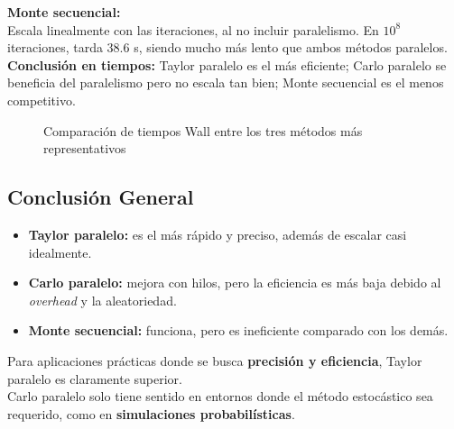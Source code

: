 \documentclass[a4paper,12pt]{article}
\begin{document}
\textbf{Monte secuencial:} \\
Escala linealmente con las iteraciones, al no incluir paralelismo. 
En $10^{8}$ iteraciones, tarda 38.6 s, siendo mucho más lento que ambos métodos paralelos. \\

\textbf{Conclusión en tiempos:} Taylor paralelo es el más eficiente; 
Carlo paralelo se beneficia del paralelismo pero no escala tan bien; 
Monte secuencial es el menos competitivo.

\begin{figure}[H]
\centering
{}
\caption{Comparación de tiempos Wall entre los tres métodos más representativos}
\end{figure}

\subsection*{Conclusión General}

\begin{itemize}
    \item \textbf{Taylor paralelo:} es el más rápido y preciso, además de escalar casi idealmente.
    \item \textbf{Carlo paralelo:} mejora con hilos, pero la eficiencia es más baja debido al \textit{overhead} y la aleatoriedad.
    \item \textbf{Monte secuencial:} funciona, pero es ineficiente comparado con los demás.
\end{itemize}

Para aplicaciones prácticas donde se busca \textbf{precisión y eficiencia}, Taylor paralelo es claramente superior. \\

Carlo paralelo solo tiene sentido en entornos donde el método estocástico sea requerido, como en \textbf{simulaciones probabilísticas}.
\end{document}
